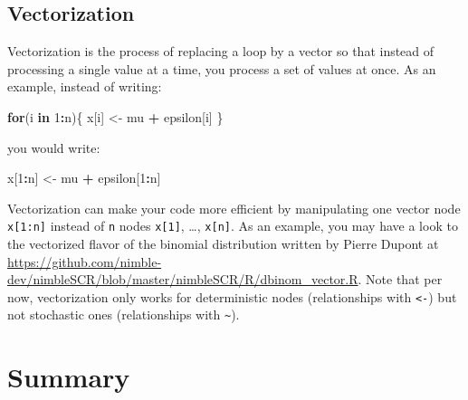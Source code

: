 \documentclass[
  12pt,
]{krantz}
\newenvironment{Shaded}{\begin{snugshade}}{\end{snugshade}}
\newcommand{\ControlFlowTok}[1]{\textcolor[rgb]{0.13,0.29,0.53}{\textbf{#1}}}
\newcommand{\DecValTok}[1]{\textcolor[rgb]{0.00,0.00,0.81}{#1}}
\newcommand{\NormalTok}[1]{#1}
\newcommand{\OtherTok}[1]{\textcolor[rgb]{0.56,0.35,0.01}{#1}}
\newcommand{\SpecialCharTok}[1]{\textcolor[rgb]{0.81,0.36,0.00}{\textbf{#1}}}
\begin{document}
\subsection{Vectorization}\label{vectorization}

Vectorization is the process of replacing a loop by a vector so that instead of processing a single value at a time, you process a set of values at once. As an example, instead of writing:

\begin{Shaded}
\begin{Highlighting}[]
\ControlFlowTok{for}\NormalTok{(i }\ControlFlowTok{in} \DecValTok{1}\SpecialCharTok{:}\NormalTok{n)\{ }
\NormalTok{  x[i] }\OtherTok{\textless{}{-}}\NormalTok{ mu }\SpecialCharTok{+}\NormalTok{ epsilon[i] }
\NormalTok{\}}
\end{Highlighting}
\end{Shaded}

you would write:

\begin{Shaded}
\begin{Highlighting}[]
\NormalTok{x[}\DecValTok{1}\SpecialCharTok{:}\NormalTok{n] }\OtherTok{\textless{}{-}}\NormalTok{ mu }\SpecialCharTok{+}\NormalTok{ epsilon[}\DecValTok{1}\SpecialCharTok{:}\NormalTok{n]}
\end{Highlighting}
\end{Shaded}

Vectorization can make your code more efficient by manipulating one vector node \texttt{x{[}1:n{]}} instead of \texttt{n} nodes \texttt{x{[}1{]}}, \ldots, \texttt{x{[}n{]}}. As an example, you may have a look to the vectorized flavor of the binomial distribution written by Pierre Dupont at \url{https://github.com/nimble-dev/nimbleSCR/blob/master/nimbleSCR/R/dbinom_vector.R}. Note that per now, vectorization only works for deterministic nodes (relationships with \texttt{\textless{}-}) but not stochastic ones (relationships with \texttt{\textasciitilde{}}).

\section{Summary}\label{summary-1}
\end{document}
